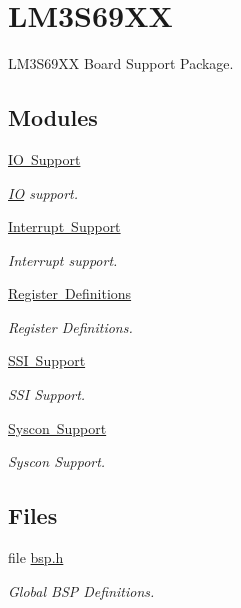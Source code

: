 \hypertarget{group__RTEMSBSPsARMLM3S69XX}{}\section{L\+M3\+S69\+XX}
\label{group__RTEMSBSPsARMLM3S69XX}


L\+M3\+S69\+XX Board Support Package.  


\subsection*{Modules}
\begin{DoxyCompactItemize}
\item 
\mbox{\hyperlink{group__lm3s69xx__io}{I\+O Support}}
\begin{DoxyCompactList}\small\item\em \mbox{\hyperlink{structIO}{IO}} support. \end{DoxyCompactList}\item 
\mbox{\hyperlink{group__lm3s69xx__interrupt}{Interrupt Support}}
\begin{DoxyCompactList}\small\item\em Interrupt support. \end{DoxyCompactList}\item 
\mbox{\hyperlink{group__lm3s69xx__reg}{Register Definitions}}
\begin{DoxyCompactList}\small\item\em Register Definitions. \end{DoxyCompactList}\item 
\mbox{\hyperlink{group__lm3s69xx__ssi}{S\+S\+I Support}}
\begin{DoxyCompactList}\small\item\em S\+SI Support. \end{DoxyCompactList}\item 
\mbox{\hyperlink{group__lm3s69xx__syscon}{Syscon Support}}
\begin{DoxyCompactList}\small\item\em Syscon Support. \end{DoxyCompactList}\end{DoxyCompactItemize}
\subsection*{Files}
\begin{DoxyCompactItemize}
\item 
file \mbox{\hyperlink{bsps_2arm_2lm3s69xx_2include_2bsp_8h}{bsp.\+h}}
\begin{DoxyCompactList}\small\item\em Global B\+SP Definitions. \end{DoxyCompactList}\end{DoxyCompactItemize}
